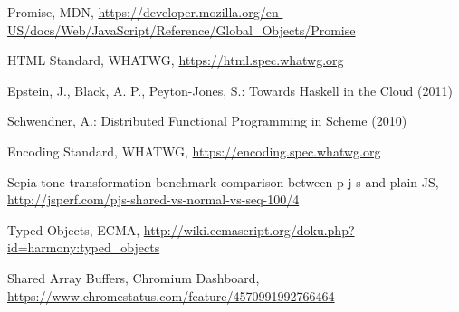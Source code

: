 \documentclass[runningheads,a4paper]{llncs}
\begin{document}
\begin{thebibliography}{4}
 Promise, MDN, \url{https://developer.mozilla.org/en-US/docs/Web/JavaScript/Reference/Global_Objects/Promise}

 HTML Standard, WHATWG, \url{https://html.spec.whatwg.org}

 Epstein, J., Black, A. P., Peyton-Jones, S.: Towards Haskell in the Cloud (2011)

 Schwendner, A.: Distributed Functional Programming in Scheme (2010)

 Encoding Standard, WHATWG, \url{https://encoding.spec.whatwg.org}

 Sepia tone transformation benchmark comparison between p-j-s and plain JS, \url{http://jsperf.com/pjs-shared-vs-normal-vs-seq-100/4}

 Typed Objects, ECMA, \url{http://wiki.ecmascript.org/doku.php?id=harmony:typed_objects}

 Shared Array Buffers, Chromium Dashboard, \url{https://www.chromestatus.com/feature/4570991992766464}

\end{thebibliography}
\end{document}
